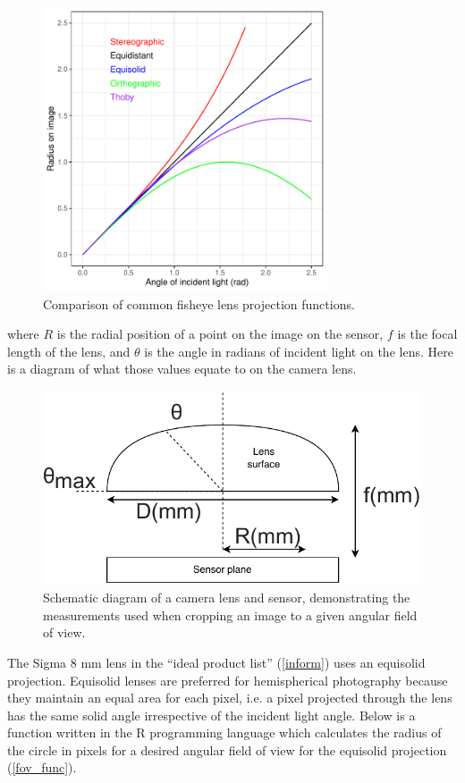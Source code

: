 \documentclass[11pt,a4paper]{article}
\begin{document}
\begin{figure}[H]
	\includegraphics[width=0.75\textwidth]{lens_proj}
	\caption{Comparison of common fisheye lens projection functions.}
	\label{lens_proj}
\end{figure}

where $R$ is the radial position of a point on the image on the sensor, $f$ is the focal length of the lens, and $\theta$ is the angle in radians of incident light on the lens. Here is a diagram of what those values equate to on the camera lens.

\begin{figure}[H]
\centering
	\includegraphics[width=\textwidth]{fov_diagram.drawio}
	\caption{Schematic diagram of a camera lens and sensor, demonstrating the measurements used when cropping an image to a given angular field of view.}
	\label{fov_diagram}
\end{figure}

The Sigma 8 mm lens in the ``ideal product list'' (\autoref{inform}) uses an equisolid projection. Equisolid lenses are preferred for hemispherical photography because they maintain an equal area for each pixel, i.e. a pixel projected through the lens has the same solid angle irrespective of the incident light angle. Below is a function written in the R programming language which calculates the radius of the circle in pixels for a desired angular field of view for the equisolid projection (\autoref{fov_func}).
\end{document}
